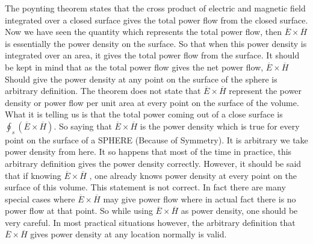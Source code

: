 The poynting theorem states that the cross product of electric and magnetic field integrated over a closed surface gives the total power flow from the closed surface. Now we have seen the quantity which represents the total power flow, then 
$\overline{E}\times\overline{H}$ is essentially the power density on the surface. So that when this power density is integrated over an area, it gives the total power flow from the surface.	 It should be kept in mind that as the total power flow gives the net power flow, $\overline{E}\times\overline{H}$ Should give the power density at any point on the surface of the sphere is arbitrary definition.  The theorem does not state that $\overline{E}\times\overline{H}$ represent the power density or power flow per unit area at every point on the surface of the volume. What it is telling us is that the total power coming out of a close surface is $\oint_{s}(\overline{E}\times\overline{H})$. So saying that $\overline{E}\times\overline{H}$ is the power density which is true for every point on the surface of a SPHERE (Because of Symmetry). It is arbitrary we take power density from here. It so happens that most of the time in practice, this arbitrary definition gives the power density correctly. However, it should be said that if knowing $\overline{E}\times\overline{H}$ , one already knows power density  at every point on the surface of this volume. This statement is not correct. In fact there are many special cases where $\overline{E}\times\overline{H}$  may give power flow where in actual fact there is no power flow at that point. So while using $\overline{E}\times\overline{H}$  as power density, one should be very careful. In most practical situations however, the arbitrary definition that $\overline{E}\times\overline{H}$  gives power density at any location normally is valid.


